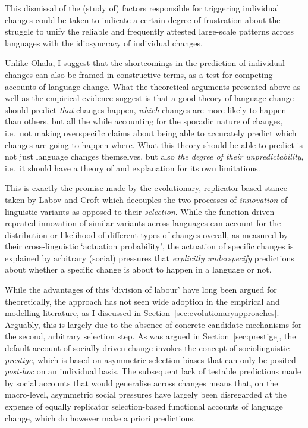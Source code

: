 This dismissal of the (study of) factors responsible for triggering individual changes could be taken to indicate a certain degree of frustration about the struggle to unify the reliable and frequently attested large-scale patterns across languages with the idiosyncracy of individual changes.

Unlike Ohala, I suggest that the shortcomings in the prediction of individual changes can also be framed in constructive terms, as a test for competing accounts of language change. What the theoretical arguments presented above as well as the empirical evidence suggest is that a good theory of language change should predict \emph{that} changes happen, \emph{which} changes are more likely to happen than others, but all the while accounting for the sporadic nature of changes, i.e.~not making overspecific claims about being able to accurately predict which changes are going to happen where.
What this theory should be able to predict is not just language changes themselves, but also \emph{the degree of their unpredictability}, i.e.~it should have a theory of and explanation for its own limitations.

This is exactly the promise made by the evolutionary, replicator-based stance taken by Labov and Croft which decouples the two processes of \emph{innovation} of linguistic variants as opposed to their \emph{selection}. While the function-driven repeated innovation of similar variants across languages can account for the distribution or likelihood of different types of changes overall, as measured by their cross-linguistic `actuation probability', the actuation of specific changes is explained by arbitrary (social) pressures that \emph{explicitly underspecify} predictions about whether a specific change is about to happen in a language or not.

While the advantages of this `division of labour' have long been argued for theoretically, the approach has not seen wide adoption in the empirical and modelling literature, as I discussed in Section~\ref{sec:evolutionaryapproaches}. Arguably, this is largely due to the absence of concrete candidate mechanisms for the second, arbitrary selection step. As was argued in Section~\ref{sec:prestige}, the default account of socially driven change invokes the concept of sociolinguistic \emph{prestige}, which is based on asymmetric selection biases that can only be posited \emph{post-hoc} on an individual basis.
The subsequent lack of testable predictions made by social accounts that would generalise across changes means that, on the macro-level, asymmetric social pressures have largely been disregarded at the expense of equally replicator selection-based functional accounts of language change, which do however make a priori predictions.

